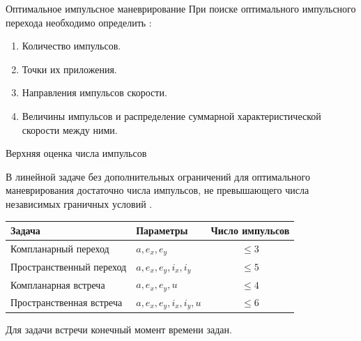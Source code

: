 \documentclass[11pt,aspectratio=169,t]{beamer}
\begin{document}
\begin{frame}{Оптимальное импульсное маневрирование}
\relax
При поиске оптимального импульсного перехода необходимо определить \cite{EdelbaumGobetzWashington1966}:
\medskip
\begin{enumerate}
 \setlength{\itemsep}{10pt}
 \item Количество импульсов.
 \item Точки их приложения.
 \item Направления импульсов скорости.
 \item Величины импульсов и распределение суммарной характеристической скорости между ними.
\end{enumerate}
\end{frame}

\begin{frame}{Верхняя оценка числа импульсов}
\relax
{\justifying
В линейной задаче без дополнительных ограничений для оптимального маневрирования достаточно числа импульсов, не превышающего числа независимых граничных условий \cite{Edelbaum1966,Neustadt1964,SternPotter1965}.\par}
\medskip
\begin{center}
\renewcommand{\arraystretch}{1.2}
\begin{tabular}{@{}l@{\qquad}l@{\qquad}c@{}}
\toprule
Задача & Параметры & Число импульсов\\
\midrule
Компланарный переход & $a,e_x,e_y$ & $\leq 3$\\
Пространственный переход & $a,e_x,e_y,i_x,i_y$ & $\leq 5$\\
Компланарная встреча & $a,e_x,e_y,u$ & $\leq 4$\\
Пространственная встреча & $a,e_x,e_y,i_x,i_y,u$ & $\leq 6$\\
\bottomrule
\end{tabular}
\end{center}
\smallskip
Для задачи встречи конечный момент времени задан.
\end{frame}
\end{document}
